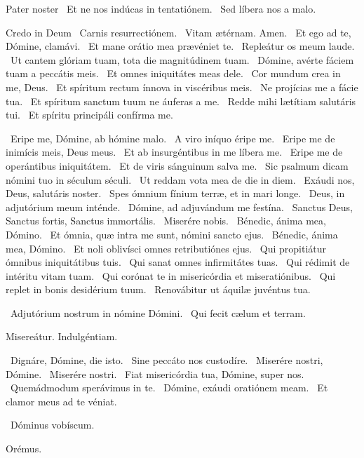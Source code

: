 Pater noster  \V\ Et ne nos indúcas in tentatiónem. \R\ Sed líbera nos a malo.

Credo in Deum  \V\ Carnis resurrectiónem. \R\ Vitam ætérnam. Amen. \V\ Et ego ad te, Dómine, clamávi. \R\ Et mane orátio mea prævéniet te. \V\ Repleátur os meum laude. \R\ Ut cantem glóriam tuam, tota die magnitúdinem tuam. \V\ Dómine, avérte fáciem tuam a peccátis meis. \R\ Et omnes iniquitátes meas dele. \V\ Cor mundum crea in me, Deus. \R\ Et spíritum rectum ínnova in viscéribus meis. \V\ Ne projícias me a fácie tua. \R\ Et spíritum sanctum tuum ne áuferas a me. \V\ Redde mihi lætítiam salutáris tui. \R\ Et spíritu principáli confírma me.


\V\ Eripe me, Dómine, ab hómine malo. \R\ A viro iníquo éripe me. \V\ Eripe me de inimícis meis, Deus meus. \R\ Et ab insurgéntibus in me líbera me. \V\ Eripe me de operántibus iniquitátem. \R\ Et de viris sánguinum salva me. \V\ Sic psalmum dicam nómini tuo in séculum séculi. \R\ Ut reddam vota mea de die in diem. \V\ Exáudi nos, Deus, salutáris noster. \R\ Spes ómnium fínium terræ, et in mari longe. \V\ Deus, in adjutórium meum inténde. \R\ Dómine, ad adjuvándum me festína. \V\ Sanctus Deus, Sanctus fortis, Sanctus immortális. \R\ Miserére nobis. \V\ Bénedic, ánima mea, Dómino. \R\ Et ómnia, quæ intra me sunt, nómini sancto ejus. \V\ Bénedic, ánima mea, Dómino. \R\ Et noli oblivísci omnes retributiónes ejus. \V\ Qui propitiátur ómnibus iniquitátibus tuis. \R\ Qui sanat omnes infirmitátes tuas. \V\ Qui rédimit de intéritu vitam tuam. \R\ Qui corónat te in misericórdia et miseratiónibus. \V\ Qui replet in bonis desidérium tuum. \R\ Renovábitur ut áquilæ juvéntus tua.


\V\ Adjutórium nostrum in nómine Dómini. \R\ Qui fecit cælum et terram.

 Misereátur. Indulgéntiam.

\V\ Dignáre, Dómine, die isto. \R\ Sine peccáto nos custodíre. \V\ Miserére nostri, Dómine. \R\ Miserére nostri. \V\ Fiat misericórdia tua, Dómine, super nos. \R\ Quemádmodum sperávimus in te. \V\ Dómine, exáudi oratiónem meam. \R\ Et clamor meus ad te véniat.

\sectionornament

\V\ Dóminus vobíscum.

Orémus. 

